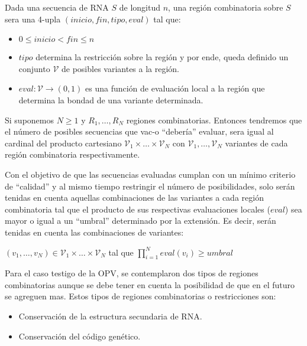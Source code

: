 \begin{definition}
\label{region}
Dada una secuencia de \ac{RNA} $S$ de longitud $n$, una regi\'on combinatoria
sobre $S$ sera una 4-upla $(inicio, fin, tipo, eval)$ tal que:
\begin{itemize}
 \item $0 \le inicio < fin \le n$
 \item $tipo$ determina la restricci\'on sobre la regi\'on y por ende, queda
definido un conjunto $\mathcal{V}$ de posibles variantes a la regi\'on.
 \item $eval: \mathcal{V} \rightarrow (0,1)$ es una funci\'on de evaluaci\'on
local a la regi\'on que determina la bondad de una variante determinada.
\end{itemize}
\end{definition}

Si suponemos $N \ge 1$ y $R_{1}, \dots, R_{N}$ regiones combinatorias.
Entonces tendremos que el n\'umero de posibles secuencias que \ac{vac-o}
``deber\'ia'' evaluar, sera igual al cardinal del producto cartesiano
$\mathcal{V}_{1} \times \dots \times \mathcal{V}_{N}$ con  $\mathcal{V}_{1},
\dots, \mathcal{V}_{N}$ variantes de cada regi\'on combinatoria respectivamente.

Con el objetivo de que las secuencias evaluadas cumplan con un m\'inimo criterio
de ``calidad'' y al mismo tiempo restringir el n\'umero de posibilidades, solo
ser\'an tenidas en cuenta aquellas combinaciones de las variantes a cada
regi\'on combinatoria tal que el producto de sus respectivas evaluaciones
locales ($eval$) sea mayor o igual a un ``umbral'' determinado por la
extensi\'on. Es decir, ser\'an tenidas en cuenta las combinaciones de variantes:
\begin{center}
$(v_{1},\dots, v_{N}) \in \mathcal{V}_{1} \times \dots \times \mathcal{V}_{N}$
tal que $\prod_{i=1}^{N} eval(v_{i}) \ge umbral$ 
\end{center}



Para el caso testigo de la \ac{OPV}, se contemplaron dos tipos de regiones
combinatorias aunque se debe tener en cuenta la posibilidad de que en el futuro
se agreguen mas. Estos tipos de regiones combinatorias o restricciones son:
\begin{itemize}
 \item Conservaci\'on de la estructura secundaria de \ac{RNA}.
 \item Conservaci\'on del c\'odigo gen\'etico.
\end{itemize}


